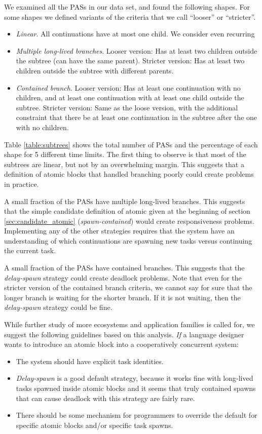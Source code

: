 \documentclass[acmsmall,anonymous,review]{acmart}\settopmatter{printfolios=true,printccs=false,printacmref=false}
\begin{document}
We examined all the PASs in our data set, and found the following shapes.
For some shapes we defined variants of the criteria that we call ``looser'' or ``stricter''.

\begin{itemize}
\item \emph{Linear}. All continuations have at most one child.
  We consider even recurring
\item \emph{Multiple long-lived branches}. Looser version: Has at least two children outside the subtree (can have the same parent).
Stricter version: Has at least two children outside the subtree with different parents.
\item \emph{Contained branch}. Looser version: Has at least one continuation with no children, and at least one continuation with at least one child outside the subtree.
  Stricter version: Same as the loose version, with the additional constraint that there be at least one continuation in the subtree after the one with no children.
\end{itemize}

Table \ref{table:subtrees} shows the total number of PASs and the percentage of each shape for 5 different time limits.
The first thing to observe is that most of the subtrees are linear, but not by an overwhelming margin.
This suggests that a definition of atomic blocks that handled branching poorly could create problems in practice.

A small fraction of the PASs have multiple long-lived branches.
This suggests that the simple candidate definition of atomic given at the beginning of section \ref{sec:candidate_atomic} (\emph{spawn-contained}) would create responsiveness problems.
Implementing any of the other strategies requires that the system have an understanding of which continuations are spawning new tasks versus continuing the current task.

A small fraction of the PASs have contained branches.
This suggests that the \emph{delay-spawn} strategy could create deadlock problems.
Note that even for the stricter version of the contained branch criteria, we cannot say for sure that the longer branch is waiting for the shorter branch.
If it is not waiting, then the \emph{delay-spawn} strategy could be fine.

While further study of more ecosystems and application families is called for, we suggest the following guidelines based on this analysis.
\emph{If} a language designer wants to introduce an atomic block into a cooperatively concurrent system:
\begin{itemize}
\item The system should have explicit task identities.
\item \emph{Delay-spawn} is a good default strategy, because it works fine with long-lived tasks spawned inside atomic blocks and it seems that truly contained spawns that can cause deadlock with this strategy are fairly rare.
\item There should be some mechanism for programmers to override the default for specific atomic blocks and/or specific task spawns.
\end{itemize}
\end{document}
